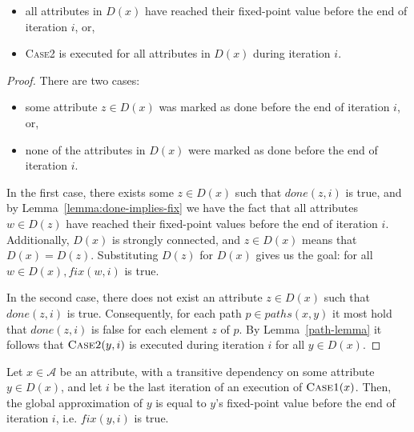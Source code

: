 {\begin{lemma}
  \begin{itemize}
    \item all attributes in $D(x)$ have reached their fixed-point value
      before the end of iteration $i$, or,
    \item \textsc{Case2} is executed for all attributes in $D(x)$ during iteration $i$.
  \end{itemize}

  \label{lemma:all-fix-or-case2}
\end{lemma}

\newpage
\begin{proof}
  There are two cases:

  \begin{itemize}
    \item some attribute $z \in D(x)$ was marked as done before the end of iteration $i$, or,
    \item none of the attributes in $D(x)$ were marked as done before the end of iteration $i$.
  \end{itemize}

  In the first case,
  there exists some $z \in D(x)$ such that $\mathit{done}(z, i)$ is true,
  and by Lemma~\ref{lemma:done-implies-fix}
  we have the fact that all attributes $w \in D(z)$ have reached their fixed-point values
  before the end of iteration $i$.
  Additionally, $D(x)$ is strongly connected, and
  $z \in D(x)$ means that $D(x) = D(z)$. Substituting $D(z)$ for $D(x)$ gives us
  the goal: for all $w \in D(x), fix(w, i)$ is true.

  In the second case, there does not exist an attribute $z \in D(x)$
  such that $\mathit{done}(z, i)$ is true.
  Consequently, for each path $p \in \mathit{paths}(x, y)$ it most hold that
  $\mathit{done}(z, i)$ is false for each element $z$ of $p$.
  By Lemma~\ref{path-lemma} it follows that $\textsc{Case2}(y, i)$ is
  executed during iteration $i$ for all $y \in D(x)$.
\end{proof}

\begin{lemma}
  Let $x \in \mathcal{A}$ be an attribute,
  with a transitive dependency on some attribute $y \in D(x)$,
  and let $i$ be the last iteration of an execution of $\textsc{Case1}(x)$.
  Then, the global approximation of $y$ is equal to $y$'s fixed-point value
  before the end of iteration $i$, i.e. $\mathit{fix}(y, i)$ is true.

  \label{lemma:case1-sound}
\end{lemma}

}
